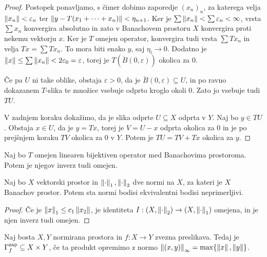 \begin{proof}
  Postopek ponavljamo, s čimer dobimo zaporedje $(x_n)_n$, za katerega velja
  $\left\lVert x_n\right\rVert < \varepsilon_n$ ter $\left\lVert y - T(x_1 + \cdots + x_n)\right\rVert < \eta_{n+1}$.
  Ker je $\sum \left\lVert x_n\right\rVert < \sum \varepsilon_n < \infty$, vrsta $\sum x_n$
  konvergira absolutno in zato v Banachovem prostoru $X$ konvergira proti nekemu
  vektorju $x$.
  Ker je $T$ omejen operator, konvergira tudi vrsta $\sum T x_n$ in velja $Tx =
  \sum T x_n$.
  To mora biti enako $y$, saj $\eta_i \to 0$.
  Dodatno je $\left\lVert x\right\rVert \le \sum \left\lVert x_n\right\rVert < 2 \varepsilon_0 = \varepsilon$,
  torej je $T(\mathring{B}(0, \varepsilon))$ okolica za $0$.

  Če pa $U$ ni take oblike, obstaja $\varepsilon > 0$, da je $\mathring{B}(0,
  \varepsilon) \subseteq U$, in po ravno dokazanem $T$-slika te množice vsebuje
  odprto kroglo okoli $0$.
  Zato jo vsebuje tudi $TU$.

  V zadnjem koraku dokažimo, da je slika odprte $U \subseteq X$ odprta v $Y$.
  Naj bo $y \in TU$.
  Obstaja $x \in U$, da je $y = Tx$, torej je $V = U - x$ odprta okolica za $0$
  in je po prejšnjem koraku $TV$ okolica za $0$ v $Y$.
  Potem je $TU = TV + Tx$ okolica za $y$.
\end{proof}


\begin{posledica}
  Naj bo $T$ omejen linearen bijektiven operator med Banachovima prostoroma.
  Potem je njegov inverz tudi omejen.
\end{posledica}


\begin{posledica}
  Naj bo $X$ vektorski prostor in $\left\lVert\cdot\right\rVert_1, \left\lVert\cdot\right\rVert_2$ dve normi na
  $X$, za kateri je $X$ Banachov prostor.
  Potem sta normi bodisi ekvivalentni bodisi neprimerljivi.
\end{posledica}

\begin{proof}
  Če je $\left\lVert x\right\rVert_1 \le c_1 \left\lVert x_2\right\rVert$, je identiteta $I: (X, \left\lVert\cdot\right\rVert_2)
  \to (X, \left\lVert\cdot\right\rVert_1)$ omejena, in je njen inverz tudi omejen.
\end{proof}


\begin{lema}
  Naj bosta $X, Y$ normirana prostora in $f: X \to Y$ zvezna preslikava.
  Tedaj je $\Gamma_f ^\text{\normalfont zap}\subseteq X \times Y$, če ta produkt opremimo z normo
  $\left\lVert(x,y)\right\rVert_\infty = \max \{\left\lVert x\right\rVert, \left\lVert y\right\rVert\}$.
\end{lema}

